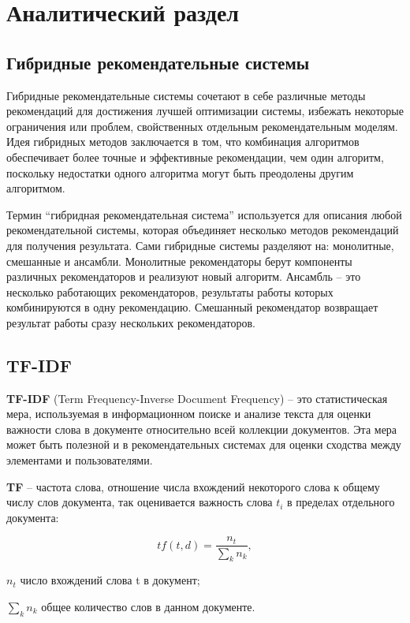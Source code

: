 \section{Аналитический раздел}

\subsection{Гибридные рекомендательные системы}

Гибридные рекомендательные системы сочетают в себе различные методы рекомендаций для достижения лучшей оптимизации системы, избежать некоторые ограничения или проблем, свойственных отдельным рекомендательным моделям. Идея гибридных методов заключается в том, что комбинация алгоритмов обеспечивает более точные и эффективные рекомендации, чем один алгоритм, поскольку недостатки одного алгоритма могут быть преодолены другим алгоритмом. \cite{hybrid}

Термин ``гибридная рекомендательная система'' используется для описания любой рекомендательной системы, которая объединяет несколько методов рекомендаций для получения результата. Сами гибридные системы разделяют на: монолитные, смешанные и ансамбли. Монолитные рекомендаторы берут компоненты различных рекомендаторов и реализуют новый алгоритм. Ансамбль -- это несколько работающих рекомендаторов, результаты работы которых комбинируются в одну рекомендацию. Смешанный рекомендатор возвращает результат работы сразу нескольких рекомендаторов. \cite{hybrid}

\subsection{TF-IDF}

\textbf{TF-IDF} (Term Frequency-Inverse Document Frequency) -- это статистическая мера, используемая в информационном поиске и анализе текста для оценки важности слова в документе относительно всей коллекции документов. Эта мера может быть полезной и в рекомендательных системах для оценки сходства между элементами и пользователями. \cite{tfidf}

\textbf{TF} -- частота слова, отношение числа вхождений некоторого слова к общему числу слов документа, так оценивается важность слова $t_i$ в пределах отдельного документа:

\begin{equation}
	tf(t, d) = \frac{n_t}{\sum_{k}{n_k}},
\end{equation}
\begin{eqexpl}[15mm]
\item{$n_t$} число вхождений слова t в документ;
\item{$\sum_{k}{n_k}$} общее количество слов в данном документе.
\end{eqexpl}

